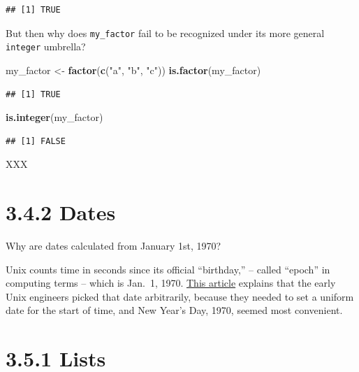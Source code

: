 \documentclass[]{book}
\newenvironment{Shaded}{\begin{snugshade}}{\end{snugshade}}
\newcommand{\KeywordTok}[1]{\textcolor[rgb]{0.13,0.29,0.53}{\textbf{#1}}}
\newcommand{\NormalTok}[1]{#1}
\newcommand{\StringTok}[1]{\textcolor[rgb]{0.31,0.60,0.02}{#1}}
\begin{document}
\begin{verbatim}
## [1] TRUE
\end{verbatim}

But then why does \texttt{my\_factor} fail to be recognized under its more general \texttt{integer} umbrella?

\begin{Shaded}
\begin{Highlighting}[]
\NormalTok{my_factor <-}\StringTok{ }\KeywordTok{factor}\NormalTok{(}\KeywordTok{c}\NormalTok{(}\StringTok{"a"}\NormalTok{, }\StringTok{"b"}\NormalTok{, }\StringTok{"c"}\NormalTok{))}
\KeywordTok{is.factor}\NormalTok{(my_factor)}
\end{Highlighting}
\end{Shaded}

\begin{verbatim}
## [1] TRUE
\end{verbatim}

\begin{Shaded}
\begin{Highlighting}[]
\KeywordTok{is.integer}\NormalTok{(my_factor)}
\end{Highlighting}
\end{Shaded}

\begin{verbatim}
## [1] FALSE
\end{verbatim}

XXX

\hypertarget{dates}{%
\section*{3.4.2 Dates}\label{dates}}

Why are dates calculated from January 1st, 1970?

Unix counts time in seconds since its official ``birthday,'' -- called ``epoch'' in computing terms -- which is Jan.~1, 1970. \href{https://www.wired.com/2001/09/unix-tick-tocks-to-a-billion/}{This article} explains that the early Unix engineers picked that date arbitrarily, because they needed to set a uniform date for the start of time, and New Year's Day, 1970, seemed most convenient.

\hypertarget{lists-1}{%
\section*{3.5.1 Lists}\label{lists-1}}
\end{document}
